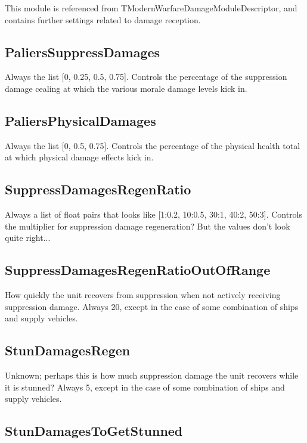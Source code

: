 \documentclass{article}
\begin{document}
This module is referenced from TModernWarfareDamageModuleDescriptor, and contains further settings related to damage reception.

\subsection{PaliersSuppressDamages}

Always the list [0, 0.25, 0.5, 0.75]. Controls the percentage of the suppression damage cealing at which the various morale damage levels kick in.

\subsection{PaliersPhysicalDamages}

Always the list [0, 0.5, 0.75]. Controls the percentage of the physical health total at which physical damage effects kick in.

\subsection{SuppressDamagesRegenRatio}

Always a list of float pairs that looks like [1:0.2, 10:0.5, 30:1, 40:2, 50:3]. Controls the multiplier for suppression damage regeneration? But the values don't look quite right...

\subsection{SuppressDamagesRegenRatioOutOfRange}

How quickly the unit recovers from suppression when not actively receiving suppression damage. Always 20, except in the case of some combination of ships and supply vehicles.

\subsection{StunDamagesRegen}

Unknown; perhaps this is how much suppression damage the unit recovers while it is stunned? Always 5, except in the case of some combination of ships and supply vehicles.

\subsection{StunDamagesToGetStunned}
\end{document}
